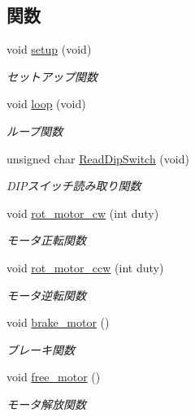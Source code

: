 \subsection*{関数}
\begin{DoxyCompactItemize}
\item 
void \mbox{\hyperlink{iraira__bo__up__down__mod_8ino_a7dfd9b79bc5a37d7df40207afbc5431f}{setup}} (void)
\begin{DoxyCompactList}\small\item\em セットアップ関数 \end{DoxyCompactList}\item 
void \mbox{\hyperlink{iraira__bo__up__down__mod_8ino_a0b33edabd7f1c4e4a0bf32c67269be2f}{loop}} (void)
\begin{DoxyCompactList}\small\item\em ループ関数 \end{DoxyCompactList}\item 
unsigned char \mbox{\hyperlink{iraira__bo__up__down__mod_8ino_a77b0a767d95108a48a54b857588d2863}{Read\+Dip\+Switch}} (void)
\begin{DoxyCompactList}\small\item\em D\+I\+Pスイッチ読み取り関数 \end{DoxyCompactList}\item 
void \mbox{\hyperlink{iraira__bo__up__down__mod_8ino_a0c28692fe5e9f44573ec307d7cae2d9b}{rot\+\_\+motor\+\_\+cw}} (int duty)
\begin{DoxyCompactList}\small\item\em モータ正転関数 \end{DoxyCompactList}\item 
void \mbox{\hyperlink{iraira__bo__up__down__mod_8ino_a0a80149a1ef7c2030aba634830be590a}{rot\+\_\+motor\+\_\+ccw}} (int duty)
\begin{DoxyCompactList}\small\item\em モータ逆転関数 \end{DoxyCompactList}\item 
void \mbox{\hyperlink{iraira__bo__up__down__mod_8ino_af7b0658dcbb1e0e8f14eb54b4edfcf72}{brake\+\_\+motor}} ()
\begin{DoxyCompactList}\small\item\em ブレーキ関数 \end{DoxyCompactList}\item 
void \mbox{\hyperlink{iraira__bo__up__down__mod_8ino_a81f542f98f75dcfd71f410277a1cb3cf}{free\+\_\+motor}} ()
\begin{DoxyCompactList}\small\item\em モータ解放関数 \end{DoxyCompactList}\item 

\end{DoxyCompactItemize}
